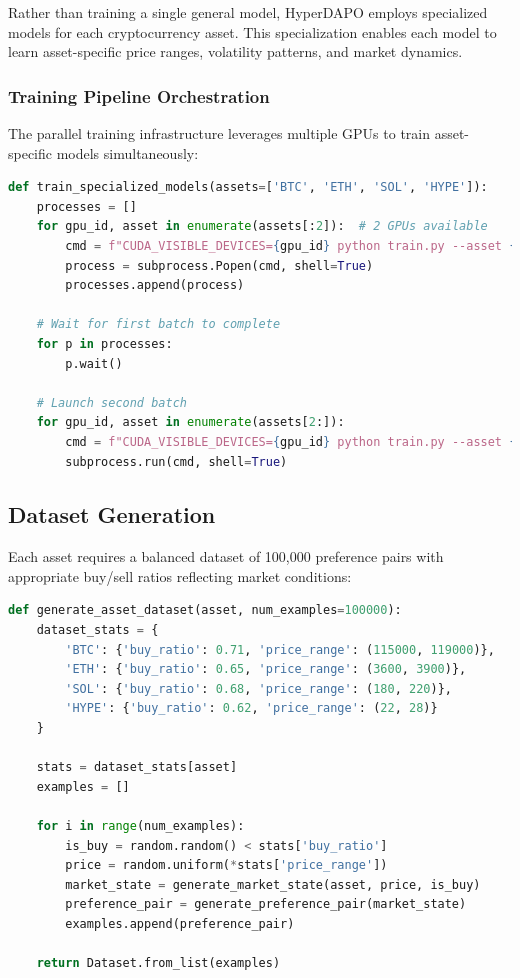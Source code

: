 \documentclass{report}
\begin{document}
Rather than training a single general model, HyperDAPO employs specialized models for each cryptocurrency asset. This specialization enables each model to learn asset-specific price ranges, volatility patterns, and market dynamics.

\subsubsection{Training Pipeline Orchestration}

The parallel training infrastructure leverages multiple GPUs to train asset-specific models simultaneously:

\begin{lstlisting}[language=Python, caption=Parallel model training]
def train_specialized_models(assets=['BTC', 'ETH', 'SOL', 'HYPE']):
    processes = []
    for gpu_id, asset in enumerate(assets[:2]):  # 2 GPUs available
        cmd = f"CUDA_VISIBLE_DEVICES={gpu_id} python train.py --asset {asset}"
        process = subprocess.Popen(cmd, shell=True)
        processes.append(process)
    
    # Wait for first batch to complete
    for p in processes:
        p.wait()
    
    # Launch second batch
    for gpu_id, asset in enumerate(assets[2:]):
        cmd = f"CUDA_VISIBLE_DEVICES={gpu_id} python train.py --asset {asset}"
        subprocess.run(cmd, shell=True)
\end{lstlisting}

\subsection{Dataset Generation}

Each asset requires a balanced dataset of 100,000 preference pairs with appropriate buy/sell ratios reflecting market conditions:

\begin{lstlisting}[language=Python, caption=Dataset statistics generation]
def generate_asset_dataset(asset, num_examples=100000):
    dataset_stats = {
        'BTC': {'buy_ratio': 0.71, 'price_range': (115000, 119000)},
        'ETH': {'buy_ratio': 0.65, 'price_range': (3600, 3900)},
        'SOL': {'buy_ratio': 0.68, 'price_range': (180, 220)},
        'HYPE': {'buy_ratio': 0.62, 'price_range': (22, 28)}
    }
    
    stats = dataset_stats[asset]
    examples = []
    
    for i in range(num_examples):
        is_buy = random.random() < stats['buy_ratio']
        price = random.uniform(*stats['price_range'])
        market_state = generate_market_state(asset, price, is_buy)
        preference_pair = generate_preference_pair(market_state)
        examples.append(preference_pair)
    
    return Dataset.from_list(examples)
\end{lstlisting}
\end{document}
